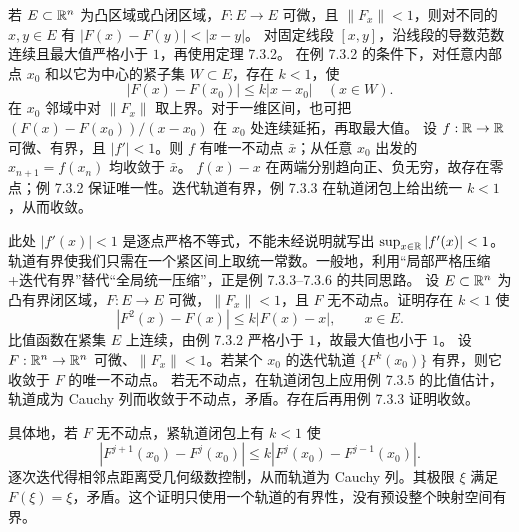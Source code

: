 若 $E\subset\mathbb R^n$ 为凸区域或凸闭区域，$F:E\to E$ 可微，且 $\|F_x\|<1$，则对不同的 $x,y\in E$ 有 $|F(x)-F(y)|<|x-y|$。
\pf 对固定线段 $[x,y]$，沿线段的导数范数连续且最大值严格小于 $1$，再使用定理 7.3.2。
在例 7.3.2 的条件下，对任意内部点 $x_0$ 和以它为中心的紧子集 $W\subset E$，存在 $k<1$，使
\[|F(x)-F(x_0)|\le k|x-x_0|\quad(x\in W).\]
\pf 在 $x_0$ 邻域中对 $\|F_x\|$ 取上界。对于一维区间，也可把 $(F(x)-F(x_0))/(x-x_0)$ 在 $x_0$ 处连续延拓，再取最大值。
设 $f:\mathbb R\to\mathbb R$ 可微、有界，且 $|f'|<1$。则 $f$ 有唯一不动点 $\bar x$；从任意 $x_0$ 出发的 $x_{n+1}=f(x_n)$ 均收敛于 $\bar x$。
\pf $f(x)-x$ 在两端分别趋向正、负无穷，故存在零点；例 7.3.2 保证唯一性。迭代轨道有界，例 7.3.3 在轨道闭包上给出统一 $k<1$，从而收敛。
\par 此处 $|f'(x)|<1$ 是逐点严格不等式，不能未经说明就写出 $\sup_{x\in\mathbb R}|f'(x)|<1$。轨道有界使我们只需在一个紧区间上取统一常数。一般地，利用“局部严格压缩+迭代有界”替代“全局统一压缩”，正是例 7.3.3--7.3.6 的共同思路。
设 $E\subset\mathbb R^n$ 为凸有界闭区域，$F:E\to E$ 可微，$\|F_x\|<1$，且 $F$ 无不动点。证明存在 $k<1$ 使
\[|F^2(x)-F(x)|\le k|F(x)-x|,\qquad x\in E.\]
\pf 比值函数在紧集 $E$ 上连续，由例 7.3.2 严格小于 $1$，故最大值也小于 $1$。
设 $F:\mathbb R^n\to\mathbb R^n$ 可微、$\|F_x\|<1$。若某个 $x_0$ 的迭代轨道 $\{F^k(x_0)\}$ 有界，则它收敛于 $F$ 的唯一不动点。
\pf 若无不动点，在轨道闭包上应用例 7.3.5 的比值估计，轨道成为 Cauchy 列而收敛于不动点，矛盾。存在后再用例 7.3.3 证明收敛。
\par 具体地，若 $F$ 无不动点，紧轨道闭包上有 $k<1$ 使
\[|F^{j+1}(x_0)-F^j(x_0)|\le k|F^j(x_0)-F^{j-1}(x_0)|.\]
逐次迭代得相邻点距离受几何级数控制，从而轨道为 Cauchy 列。其极限 $\xi$ 满足 $F(\xi)=\xi$，矛盾。这个证明只使用一个轨道的有界性，没有预设整个映射空间有界。

